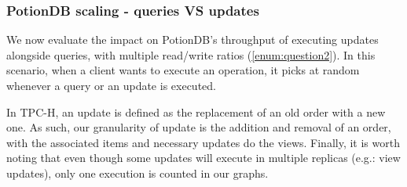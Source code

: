 \documentclass{vldb}
\begin{document}
\subsubsection{PotionDB scaling - queries VS updates}

We now evaluate the impact on PotionDB's throughput of executing updates alongside queries, with multiple read/write ratios (\ref{enum:question2}).
In this scenario, when a client wants to execute an operation, it picks at random whenever a query or an update is executed.

In TPC-H, an update is defined as the replacement of an old order with a new one.
As such, our granularity of update is the addition and removal of an order, with the associated items and necessary updates do the views.
Finally, it is worth noting that even though some updates will execute in multiple replicas (e.g.: view updates), only one execution is counted in our graphs.
\end{document}

